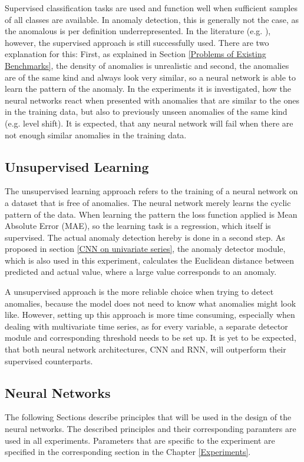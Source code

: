 Supervised classification tasks are used and function well when sufficient samples of all classes are available. In anomaly detection, this is generally not the case, as the anomalous is per definition underrepresented. In the literature (e.g. \parencite{Wen2019}), however, the supervised approach is still successfully used. There are two explanation for this: First, as explained in Section \ref{Problems of Existing Benchmarks}, the density of anomalies is unrealistic and second, the anomalies are of the same kind and always look very similar, so a neural network is able to learn the pattern of the anomaly. In the experiments it is investigated, how the neural networks react when presented with anomalies that are similar to the ones in the training data, but also to previously unseen anomalies of the same kind (e.g. level shift). It is expected, that any neural network will fail when there are not enough similar anomalies in the training data.

\subsection{Unsupervised Learning}
The unsupervised learning approach refers to the training of a neural network on a dataset that is free of anomalies. The neural network merely learns the cyclic pattern of the data. When learning the pattern the loss function applied is Mean Absolute Error (MAE), so the learning task is a regression, which itself is supervised. The actual anomaly detection hereby is done in a second step. As proposed in section \ref{CNN on univariate series}, the anomaly detector module, which is also used in this experiment, calculates the Euclidean distance between predicted and actual value, where a large value corresponds to an anomaly.

A unsupervised approach is the more reliable choice when trying to detect anomalies, because the model does not need to know what anomalies might look like. However, setting up this approach is more time consuming, especially when dealing with multivariate time series, as for every variable, a separate detector module and corresponding threshold needs to be set up. It is yet to be expected, that both neural network architectures, CNN and RNN, will outperform their supervised counterparts. 

\subsection{Neural Networks}
The following Sections describe principles that will be used in the design of the neural networks. The described principles and their corresponding paramters are used in all experiments. Parameters that are specific to the experiment are specified in the corresponding section in the Chapter \ref{Experiments}. 

